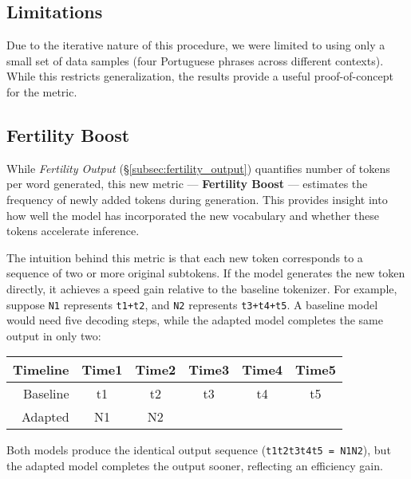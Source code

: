 \subsection*{\textbf{Limitations}}
\label{subsec:fertility_output-limitations}
Due to the iterative nature of this procedure, we were limited to using only a small set of data samples (four Portuguese phrases across different contexts). While this restricts generalization, the results provide a useful proof-of-concept for the metric.


\subsection*{\textbf{Fertility Boost}}
\label{subsec:fertility_boost}

While \textit{Fertility Output} (\S\ref{subsec:fertility_output}) quantifies number of tokens per word generated, this new metric --- \textbf{Fertility Boost} --- estimates the frequency of newly added tokens during generation. This provides insight into how well the model has incorporated the new vocabulary and whether these tokens accelerate inference.

The intuition behind this metric is that each new token corresponds to a sequence of two or more original subtokens. If the model generates the new token directly, it achieves a speed gain relative to the baseline tokenizer. For example, suppose \texttt{N1} represents \texttt{t1+t2}, and \texttt{N2} represents \texttt{t3+t4+t5}. A baseline model would need five decoding steps, while the adapted model completes the same output in only two:

\begin{center}
    \begin{tabular}{r|ccccc}
        \textbf{Timeline} & Time1 & Time2 & Time3 & Time4 & Time5 \\
        \hline
        Baseline           & t1    & t2    & t3    & t4    & t5 \\
        Adapted            & N1    & N2    &       &       &  \\
    \end{tabular}
\end{center}

Both models produce the identical output sequence (\texttt{t1t2t3t4t5 = N1N2}), but the adapted model completes the output sooner, reflecting an efficiency gain.

